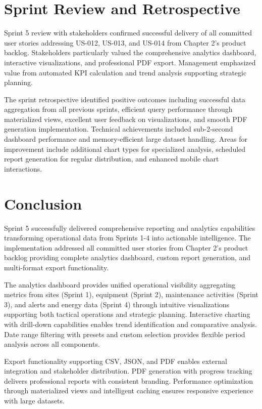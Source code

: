 \section{Sprint Review and Retrospective}

Sprint 5 review with stakeholders confirmed successful delivery of all committed user stories addressing US-012, US-013, and US-014 from Chapter 2's product backlog. Stakeholders particularly valued the comprehensive analytics dashboard, interactive visualizations, and professional PDF export. Management emphasized value from automated KPI calculation and trend analysis supporting strategic planning.

The sprint retrospective identified positive outcomes including successful data aggregation from all previous sprints, efficient query performance through materialized views, excellent user feedback on visualizations, and smooth PDF generation implementation. Technical achievements included sub-2-second dashboard performance and memory-efficient large dataset handling. Areas for improvement include additional chart types for specialized analysis, scheduled report generation for regular distribution, and enhanced mobile chart interactions.

\section{Conclusion}

Sprint 5 successfully delivered comprehensive reporting and analytics capabilities transforming operational data from Sprints 1-4 into actionable intelligence. The implementation addressed all committed user stories from Chapter 2's product backlog providing complete analytics dashboard, custom report generation, and multi-format export functionality.

The analytics dashboard provides unified operational visibility aggregating metrics from sites (Sprint 1), equipment (Sprint 2), maintenance activities (Sprint 3), and alerts and energy data (Sprint 4) through intuitive visualizations supporting both tactical operations and strategic planning. Interactive charting with drill-down capabilities enables trend identification and comparative analysis. Date range filtering with presets and custom selection provides flexible period analysis across all components.

Export functionality supporting CSV, JSON, and PDF enables external integration and stakeholder distribution. PDF generation with progress tracking delivers professional reports with consistent branding. Performance optimization through materialized views and intelligent caching ensures responsive experience with large datasets.

